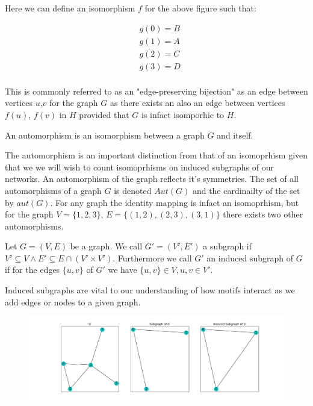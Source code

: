 Here we can define an isomorphism $f$ for the above figure such that:

\begin{align*}
    &g(0) = B\\
    &g(1) = A\\
    &g(2) = C\\
    &g(3) = D\\ 
\end{align*}

This is commonly referred to as an "edge-preserving bijection" as an edge between vertices $u$,$v$ for the 
graph $G$ as there exists an also an edge between vertices $f(u)$, $f(v)$ in $H$ provided that $G$ is infact
isomporhic to $H$. 

\begin{dfn}
    An automorphism is an isomorphism between a graph $G$ and itself.
\end{dfn}

The automorphism is an important distinction from that of an isomoprhism given that we we will
wish to count isomoprhisms on induced subgraphs of our networks. An automorphism of the graph
reflects it's symmetries. The set of all automorphisms of a graph $G$ is denoted $Aut(G)$ and 
the cardinailty of the set by $aut(G)$. For any graph the identity mapping is infact an isomoprhism,
but for the graph $V = \{1,2,3\}$, $E=\{(1,2),(2,3),(3,1)\}$ there exists two other automorphisms.



\begin{dfn}
    Let $G=(V,E)$ be a graph. We call $G'=(V',E')$ a subgraph if
     $V' \subseteq V \land E' \subseteq E \cap (V' \times V')$. Furthermore we call $G'$
     an induced subgraph of $G$ if for the edges $\{u,v\}$ of $G'$ we have $\{u,v\} \in V, u,v \in V'$.
\end{dfn}

Induced subgraphs are vital to our understanding of how motifs interact as we add edges or nodes
to a given graph.

\begin{figure}[h!]
    \includegraphics[width=15cm]{Images/subgraph.png}
    \centering
\end{figure}


